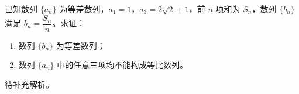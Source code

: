 \begin{prob}[source={选修二P41页}, topic={等差数列与等比数列}, score=12]
已知数列 $\{a_n\}$ 为等差数列，$a_1 = 1$，$a_3 = 2\sqrt{2}+1$，前 $n$ 项和为 $S_n$，数列 $\{b_n\}$ 满足 $b_n = \dfrac{S_n}{n}$。求证：
\begin{enumerate}
	\item[(1)] 数列 $\{b_n\}$ 为等差数列；
	\item[(2)] 数列 $\{a_n\}$ 中的任意三项均不能构成等比数列。
\end{enumerate}
\end{prob}
\begin{prob-sol}
待补充解析。
\end{prob-sol}
